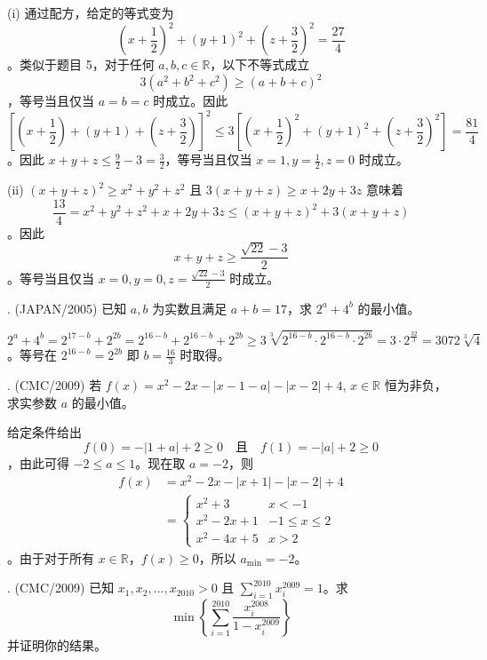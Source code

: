 \begin{questions}
\begin{solution}
(i) 通过配方，给定的等式变为
\[
\left(x + \frac{1}{2}\right)^2 + (y + 1)^2 + \left(z + \frac{3}{2}\right)^2 = \frac{27}{4}
\]
。类似于题目 5，对于任何 $a, b, c \in \mathbb{R}$，以下不等式成立
\[
3(a^2 + b^2 + c^2) \ge (a + b + c)^2
\]
，等号当且仅当 $a = b = c$ 时成立。因此
\[
\left[\left(x + \frac{1}{2}\right) + (y + 1) + \left(z + \frac{3}{2}\right)\right]^2 \le 3\left[\left(x + \frac{1}{2}\right)^2 + (y + 1)^2 + \left(z + \frac{3}{2}\right)^2\right] = \frac{81}{4}
\]
。因此 $x + y + z \le \frac{9}{2} - 3 = \frac{3}{2}$，等号当且仅当 $x = 1, y = \frac{1}{2}, z = 0$ 时成立。

(ii) $(x + y + z)^2 \ge x^2 + y^2 + z^2$ 且 $3(x + y + z) \ge x + 2y + 3z$ 意味着
\[
\frac{13}{4} = x^2 + y^2 + z^2 + x + 2y + 3z \le (x + y + z)^2 + 3(x + y + z)
\]
。因此
\[
x + y + z \ge \frac{\sqrt{22} - 3}{2}
\]
。等号当且仅当 $x = 0, y = 0, z = \frac{\sqrt{22} - 3}{2}$ 时成立。
\end{solution}



. (JAPAN/2005) 已知 $a, b$ 为实数且满足 $a + b = 17$，求 $2^a + 4^b$ 的最小值。

\begin{solution}
\[
2^a + 4^b = 2^{17-b} + 2^{2b} = 2^{16-b} + 2^{16-b} + 2^{2b} \ge 3\sqrt[3]{2^{16-b} \cdot 2^{16-b} \cdot 2^{2b}} = 3 \cdot 2^{\frac{32}{3}} = 3072\sqrt[3]{4}
\]
。等号在 $2^{16-b} = 2^{2b}$ 即 $b = \frac{16}{3}$ 时取得。
\end{solution}

. (CMC/2009) 若 $f(x) = x^2 - 2x - |x - 1 - a| - |x - 2| + 4$, $x \in \mathbb{R}$ 恒为非负，求实参数 $a$ 的最小值。

\begin{solution}
给定条件给出
\[
f(0) = -|1 + a| + 2 \ge 0 \quad \text{且} \quad f(1) = -|a| + 2 \ge 0
\]
，由此可得 $-2 \le a \le 1$。现在取 $a = -2$，则
\begin{align*}
f(x) &= x^2 - 2x - |x + 1| - |x - 2| + 4 \\
&= \begin{cases} x^2 + 3 & x < -1 \\ x^2 - 2x + 1 & -1 \le x \le 2 \\ x^2 - 4x + 5 & x > 2 \end{cases}
\end{align*}
。由于对于所有 $x \in \mathbb{R}$，$f(x) \ge 0$，所以 $a_{\min} = -2$。
\end{solution}

. (CMC/2009) 已知 $x_1, x_2, \dots, x_{2010} > 0$ 且 $\sum_{i=1}^{2010} x_i^{2009} = 1$。求
\[
\min \left\{ \sum_{i=1}^{2010} \frac{x_i^{2008}}{1 - x_i^{2009}} \right\}
\]
并证明你的结果。


\end{questions}
